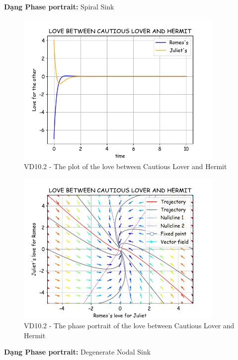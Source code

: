 \textbf{Dạng Phase portrait: } Spiral Sink
\pagebreak
\begin{figure}[!htbp]
    \centering
    \includegraphics[width=100mm]{image/bt2/plot10.2.png}
    \caption{VD10.2 - The plot of the love between Cautious Lover and Hermit}
\end{figure}
\begin{figure}[!htbp]
    \centering
    \includegraphics[width=100mm]{image/bt2/pp10.2.png}
    \caption{VD10.2 - The phase portrait of the love between Cautious Lover and Hermit}
\end{figure}

\textbf{Dạng Phase portrait: } Degenerate Nodal Sink
\pagebreak